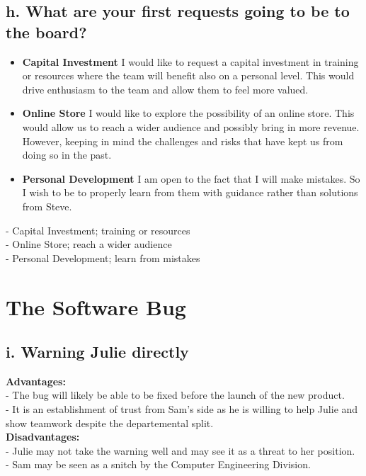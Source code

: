 \documentclass{article}
\begin{document}
\subsection{h. What are your first requests going to be to the board?}

\begin{itemize}
    \item \textbf{Capital Investment} I would like to request a capital investment in training or resources where the team will benefit also on a personal level. This would drive enthusiasm to the team and allow them to feel more valued. \\
    \item \textbf{Online Store} I would like to explore the possibility of an online store. This would allow us to reach a wider audience and possibly bring in more revenue. However, keeping in mind the challenges and risks that have kept us from doing so in the past. \\
    \item \textbf{Personal Development} I am open to the fact that I will make mistakes. So I wish to be to properly learn from them with guidance rather than solutions from Steve. \\
\end{itemize}

- Capital Investment; training or resources \\
- Online Store; reach a wider audience \\
- Personal Development; learn from mistakes \\

\section{The Software Bug}
\subsection{i. Warning Julie directly}
\textbf{Advantages:} \\
- The bug will likely be able to be fixed before the launch of the new product. \\
- It is an establishment of trust from Sam's side as he is willing to help Julie and show teamwork despite the departemental split. \\

\textbf{Disadvantages:} \\
- Julie may not take the warning well and may see it as a threat to her position. \\
- Sam may be seen as a snitch by the Computer Engineering Division. \\
\end{document}
